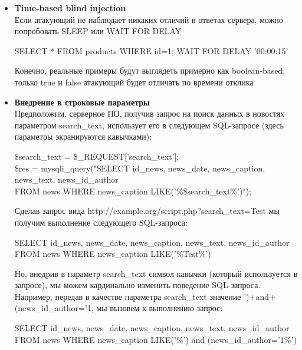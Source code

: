 \begin{itemize}
    \item \textbf{Time-based blind injection}\\
    Если атакующий не наблюдает никаких отличий в ответах сервера, можно попробовать SLEEP или WAIT FOR DELAY

    \begin{grayquote}
        SELECT * FROM products WHERE id=1; WAIT FOR DELAY '00:00:15'
    \end{grayquote}
    Конечно, реальные примеры будут выглядеть примерно как boolean-based, только true и false атакующий будет отличать по времени отклика
    
        \item \textbf{Внедрение в строковые параметры}\\
   Предположим, серверное ПО, получив запрос на поиск данных в новостях параметром search\_text, использует его в следующем SQL-запросе (здесь параметры экранируются кавычками):\\
    \begin{grayquote}
    	\$search\_text = \$\_REQUEST['search\_text'];\\
    	\$res = mysqli\_query("SELECT id\_news, news\_date, news\_caption, news\_text, news\_id\_author\\
    	FROM news WHERE news\_caption LIKE('\%\$search\_text\%')");
    \end{grayquote}
    
    Сделав запрос вида http://example.org/script.php?search\_text=Test мы получим выполнение следующего SQL-запроса:\\
    \begin{grayquote}
    	SELECT id\_news, news\_date, news\_caption, news\_text, news\_id\_author FROM news 
    	WHERE news\_caption LIKE('\%Test\%')
    \end{grayquote}
    
        Но, внедрив в параметр search\_text символ кавычки (который используется в запросе), мы можем кардинально изменить поведение SQL-запроса. Например, передав в качестве параметра search\_text значение ')+and+(news\_id\_author='1, мы вызовем к выполнению запрос:\\
    \begin{grayquote}
    	SELECT id\_news, news\_date, news\_caption, news\_text, news\_id\_author FROM news 
    	WHERE news\_caption LIKE('\%') and (news\_id\_author='1\%')
    \end{grayquote}
    
    
\end{itemize}



